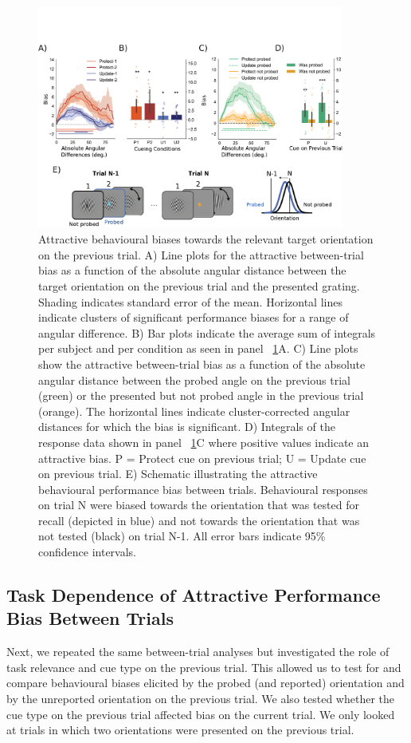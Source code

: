 \documentclass{article}
\begin{document}
\begin{large}
\begin{figure}
\centering\includegraphics[width=0.9\textwidth]{figures/figure3_behav_between_trial.png} 
\caption[Attractive behavioural biases towards the relevant target orientation on the previous trial.]{Attractive behavioural biases towards the relevant target orientation on the previous trial. A) Line plots for the attractive between-trial bias as a function of the absolute angular distance between the target orientation on the previous trial and the presented grating. Shading indicates standard error of the mean. Horizontal lines indicate clusters of significant performance biases for a range of angular difference. B) Bar plots indicate the average sum of integrals per subject and per condition as seen in panel ~\ref{fig:behav_attractive}A. C) Line plots show the attractive between-trial bias as a function of the absolute angular distance between the probed angle on the previous trial (green) or the presented but not probed angle in the previous trial (orange). The horizontal lines indicate cluster-corrected angular distances for which the bias is significant. D) Integrals of the response data shown in panel ~\ref{fig:behav_attractive}C where positive values indicate an attractive bias. P = Protect cue on previous trial; U = Update cue on previous trial. E) Schematic illustrating the attractive behavioural performance bias between trials. Behavioural responses on trial N were biased towards the orientation that was tested for recall (depicted in blue) and not towards the orientation that was not tested (black) on trial N-1. All error bars indicate 95\% confidence intervals.}
\label{fig:behav_attractive}\end{figure}


\subsection{Task Dependence of Attractive Performance Bias Between Trials}
Next, we repeated the same between-trial analyses but investigated the role of task relevance and cue type on the previous trial. This allowed us to test for and compare behavioural biases elicited by the probed (and reported) orientation and by the unreported orientation on the previous trial. We also tested whether the cue type on the previous trial affected bias on the current trial. We only looked at trials in which two orientations were presented on the previous trial.



\end{large}
\end{document}

